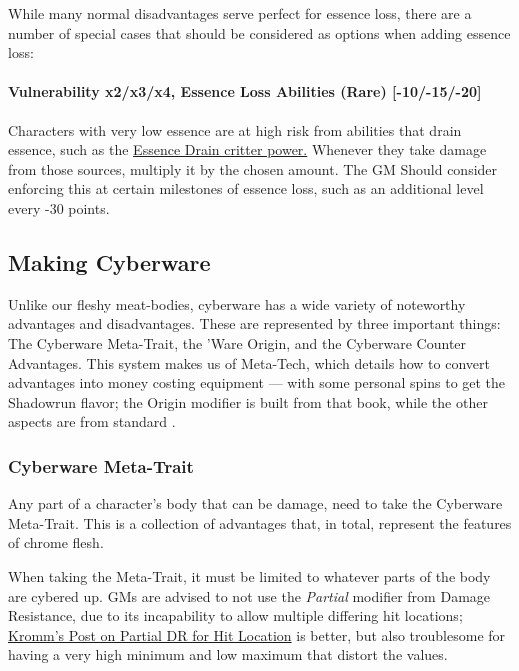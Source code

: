 \begin{multicols*}{3}
	While many normal disadvantages serve perfect for essence loss, there are a number of special cases that should be considered as options when adding essence loss:
	
	\paragraph{Vulnerability x2/x3/x4, Essence Loss Abilities (Rare) [-10/-15/-20]}
	
	Characters with very low essence are at high risk from abilities that drain essence, such as the \hyperref[essence_drain]{Essence Drain critter power.} Whenever they take damage from those sources, multiply it by the chosen amount. The GM Should consider enforcing this at certain milestones of essence loss, such as an additional level every -30 points.
	
	\subsection{Making Cyberware}
	
	Unlike our fleshy meat-bodies, cyberware has a wide variety of noteworthy advantages and disadvantages. These are represented by three important things: The Cyberware Meta-Trait, the 'Ware Origin, and the Cyberware Counter Advantages. This system makes us of \GURPS Meta-Tech, which details how to convert advantages into money costing equipment — with some personal spins to get the Shadowrun flavor; the Origin modifier is built from that book, while the other aspects are from standard \GURPS.
	
	\subsubsection{Cyberware Meta-Trait}\label{cyberware-meta-trait}
	
	Any part of a character's body that can be damage, need to take the Cyberware Meta-Trait. This is a collection of advantages that, in total, represent the features of chrome flesh.
	
	When taking the Meta-Trait, it must be limited to whatever parts of the body are cybered up. GMs are advised to not use the \textit{Partial} modifier from Damage Resistance, due to its incapability to allow multiple differing hit locations; \textcolor{Blue}{\href{http://forums.sjgames.com/showpost.php?p=623207&postcount=1}{Kromm's Post on Partial DR for Hit Location}} is better, but also troublesome for having a very high minimum and low maximum that distort the values.
	

\end{multicols*}
